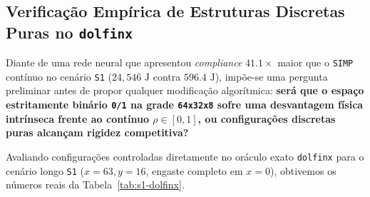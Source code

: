 \documentclass[11pt,a4paper]{article}
\begin{document}
\subsection{Verificação Empírica de Estruturas Discretas Puras no \texttt{dolfinx}}

Diante de uma rede neural que apresentou \emph{compliance} $41.1\times$ maior que o \texttt{SIMP} contínuo no cenário \texttt{S1} ($24{,}546\text{ J}$ contra $596.4\text{ J}$), impõe-se uma pergunta preliminar antes de propor qualquer modificação algorítmica: \textbf{será que o espaço estritamente binário \texttt{0/1} na grade \texttt{64x32x8} sofre uma desvantagem física intrínseca frente ao contínuo $\rho \in [0,1]$, ou configurações discretas puras alcançam rigidez competitiva?}

Avaliando configurações controladas diretamente no oráculo exato \texttt{dolfinx} para o cenário longo \texttt{S1} ($x = 63, y = 16$, engaste completo em $x = 0$), obtivemos os números reais da Tabela~\ref{tab:s1-dolfinx}.

\begin{table}[htbp]
\centering
\caption{Ensaio físico controlado em \texttt{dolfinx} no cenário \texttt{S1}: geometrias discretas \texttt{0/1} contra \texttt{SIMP} contínuo.}
\label{tab:s1-dolfinx}
\end{table}
\end{document}
